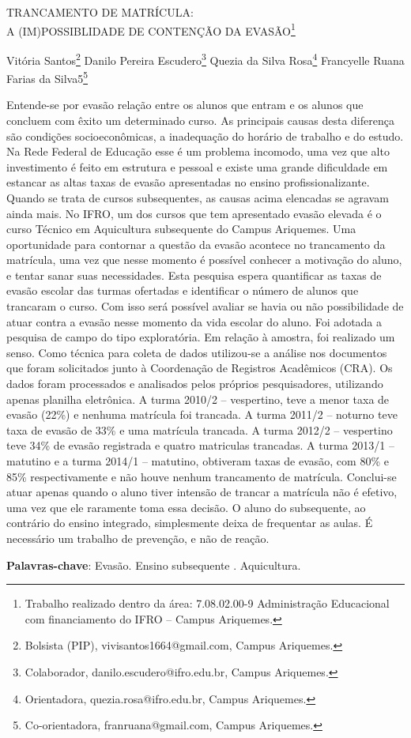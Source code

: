 \documentclass[article,12pt,onesidea,4paper,english,brazil]{abntex2}
\begin{document}
	
	
	\frenchspacing 
	
	\begin{center}
		\LARGE TRANCAMENTO DE MATRÍCULA:\\A (IM)POSSIBLIDADE DE CONTENÇÃO DA EVASÃO\footnote{Trabalho realizado dentro da área: 7.08.02.00-9 Administração Educacional com financiamento do IFRO – Campus Ariquemes.}
		
		\normalsize
		Vitória Santos\footnote{Bolsista (PIP), vivisantos1664@gmail.com, Campus Ariquemes.} 
	Danilo Pereira Escudero\footnote{Colaborador, danilo.escudero@ifro.edu.br, Campus Ariquemes.} 
	Quezia da Silva Rosa\footnote{Orientadora, quezia.rosa@ifro.edu.br, Campus Ariquemes.} 
	Francyelle Ruana Farias da Silva5\footnote{Co-orientadora, franruana@gmail.com, Campus Ariquemes.} 
	\end{center}
	
	\noindent Entende-se por evasão relação entre os alunos que entram e os alunos que concluem com êxito um determinado curso. As principais causas desta diferença são condições socioeconômicas, a inadequação do horário de trabalho e do estudo. Na Rede Federal de Educação esse é um problema incomodo, uma vez que alto investimento é feito em estrutura e pessoal e existe uma grande dificuldade em estancar as altas taxas de evasão apresentadas no ensino profissionalizante. Quando se trata de cursos subsequentes, as causas acima elencadas se agravam ainda mais. No IFRO, um dos cursos que tem apresentado evasão elevada é o curso Técnico em Aquicultura subsequente do Campus Ariquemes. Uma oportunidade para contornar a questão da evasão acontece no trancamento da matrícula, uma vez que nesse momento é possível conhecer a motivação do aluno, e tentar sanar suas necessidades. Esta pesquisa espera quantificar as taxas de evasão escolar das turmas ofertadas e identificar o número de alunos que trancaram o curso. Com isso será possível avaliar se havia ou não possibilidade de atuar contra a evasão nesse momento da vida escolar do aluno. Foi adotada a pesquisa de campo do tipo exploratória. Em relação à amostra, foi realizado um senso. Como técnica para coleta de dados utilizou-se a análise nos documentos que foram solicitados junto à Coordenação de Registros Acadêmicos (CRA). Os dados foram processados e analisados pelos próprios pesquisadores, utilizando apenas planilha eletrônica. A turma 2010/2 – vespertino, teve a menor taxa de evasão (22\%) e nenhuma matrícula foi trancada. A turma 2011/2 – noturno teve taxa de evasão de 33\% e uma matrícula trancada. A turma 2012/2 – vespertino teve 34\% de evasão registrada e quatro matriculas trancadas. A turma 2013/1 – matutino e a turma 2014/1 – matutino, obtiveram taxas de evasão, com 80\% e 85\% respectivamente e não houve nenhum trancamento de matrícula. Conclui-se atuar apenas quando o aluno tiver intensão de trancar a matrícula não é efetivo, uma vez que ele raramente toma essa decisão. O aluno do subsequente, ao contrário do ensino integrado, simplesmente deixa de frequentar as aulas. É necessário um trabalho de prevenção, e não de reação.
	
	\vspace{\onelineskip}
	
	\noindent
	\textbf{Palavras-chave}: Evasão. Ensino subsequente . Aquicultura.
	
\end{document}
